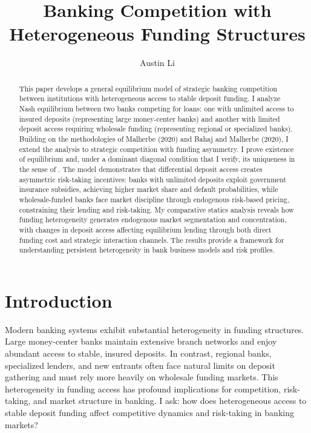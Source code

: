 \documentclass[12pt]{article}
\title{Banking Competition with Heterogeneous Funding Structures}
\author{Austin Li}
\date{}
\begin{document}
\maketitle

\begin{abstract}
This paper develops a general equilibrium model of strategic banking competition between institutions with heterogeneous access to stable deposit funding. I analyze Nash equilibrium between two banks competing for loans: one with unlimited access to insured deposits (representing large money-center banks) and another with limited deposit access requiring wholesale funding (representing regional or specialized banks). Building on the methodologies of Malherbe (2020) and Bahaj and Malherbe (2020), I extend the analysis to strategic competition with funding asymmetry. I prove existence of equilibrium and, under a dominant diagonal condition that I verify, its uniqueness in the sense of \citet{Rosen1965}. The model demonstrates that differential deposit access creates asymmetric risk-taking incentives: banks with unlimited deposits exploit government insurance subsidies, achieving higher market share and default probabilities, while wholesale-funded banks face market discipline through endogenous risk-based pricing, constraining their lending and risk-taking. My comparative statics analysis reveals how funding heterogeneity generates endogenous market segmentation and concentration, with changes in deposit access affecting equilibrium lending through both direct funding cost and strategic interaction channels. The results provide a framework for understanding persistent heterogeneity in bank business models and risk profiles.
\end{abstract}

\section{Introduction}
Modern banking systems exhibit substantial heterogeneity in funding structures. Large money-center banks maintain extensive branch networks and enjoy abundant access to stable, insured deposits. In contrast, regional banks, specialized lenders, and new entrants often face natural limits on deposit gathering and must rely more heavily on wholesale funding markets. This heterogeneity in funding access has profound implications for competition, risk-taking, and market structure in banking. I ask: how does heterogeneous access to stable deposit funding affect competitive dynamics and risk-taking in banking markets?
\end{document}
